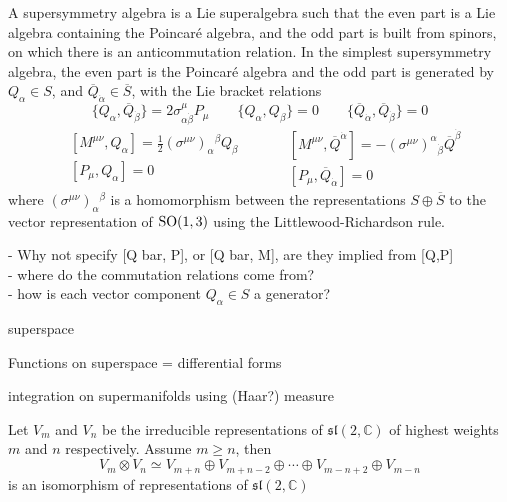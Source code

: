 A supersymmetry algebra is a Lie superalgebra such that the even part is a Lie
algebra containing the Poincar\'e algebra, and the odd part is built from
spinors, on which there is an anticommutation relation. 
In the simplest supersymmetry algebra, the even part is the Poincar\'e algebra and
the odd part is generated by $Q_{\alpha} \in S$, and
$\overline{Q}_{\dot{\alpha}} \in \overline{S}$, with the Lie bracket relations
\[
	\{Q_\alpha,\overline{Q}_{\dot{\beta}}\} 
	= 2\sigma^{\mu}_{\alpha \dot{\beta}} P_{\mu} 
	\qquad
	\{Q_\alpha,Q_{\beta}\} = 0
	\qquad
	\{\overline{Q}_{\dot{\alpha}}, \overline{Q}_{\dot{\beta}}\} = 0 
\] 
\begin{equation*}
	\begin{split}
		&[M^{\mu\nu}, Q_{\alpha}] 
		= \frac{1}{2} (\sigma^{\mu\nu})_{\alpha}{}^{\beta}Q_\beta \\
		&[P_{\mu}, Q_{\alpha}] 
		= 0 
	\end{split}
	\qquad
	\begin{split}
		&[M^{\mu\nu}, \overline{Q}^{\dot{\alpha}}] = 
		-(\sigma^{\mu\nu})^{\alpha}{}_{\dot{\beta}}\overline{Q}^{\dot{\beta}}\\
		&[P_\mu, \overline{Q}_{\dot{\alpha}}] = 0
	\end{split}
\end{equation*}
where $(\sigma^{\mu\nu})_{\alpha}{}^{\beta}$ is a homomorphism between the
representations $S\oplus\overline{S}$ to the vector representation of
$\operatorname{SO}(1,3)$ using the Littlewood-Richardson rule.

- Why not specify [Q bar, P], or [Q bar, M], are they implied from [Q,P] \\
- where do the commutation relations come from? \\
- how is each vector component $Q_{\alpha}\in S$ a generator? 

\begin{defn}
	superspace
\end{defn}

Functions on superspace = differential forms

integration on supermanifolds using (Haar?) measure


\begin{thm}
	Let $V_m$ and $V_n$ be the irreducible representations of
	$\mathfrak{sl}(2,\mathbb{C})$ of highest weights $m$ and $n$ respectively.
	Assume  $m\geq n$, then
	\[
	V_m \otimes V_n \simeq V_{m+n} \oplus V_{m+n-2} \oplus \cdots \oplus 
	V_{m-n+2} \oplus V_{m-n}
	\] 
	is an isomorphism of representations of $\mathfrak{sl}(2,\mathbb{C})$
\end{thm}
\begin{comment}
	The idea of the proof is to define formal characters of lie algebra reps.
	prove two reps are isomorphic iff they have the same character. 
	Then show how the character behaves under direct sum and tensor product.
	Then show that the two sides have the same character.
\end{comment}
